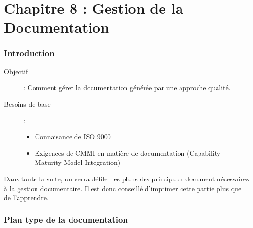\part{Chapitre 8 : Gestion de la Documentation}

\section{Introduction}

\begin{description}
\item[Objectif] : Comment gérer la documentation générée par une approche qualité.
\item[Besoins de base] :
	\begin{itemize}
	\item Connaisance de ISO 9000
	\item Exigences de CMMI en matière de documentation (Capability Maturity Model Integration)
	\end{itemize}
\end{description}

Dans toute la suite, on verra défiler les plans des principaux document nécessaires à la gestion documentaire. Il est donc conseillé d’imprimer cette partie plus que de l’apprendre.

\section{Plan type de la documentation}

